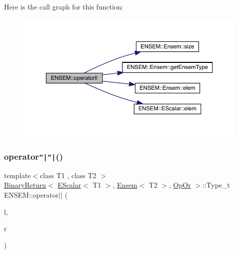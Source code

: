 Here is the call graph for this function\+:\nopagebreak
\begin{figure}[H]
\begin{center}
\leavevmode
\includegraphics[width=350pt]{d1/d9e/group__eensem_ga575e86e9777d7a353311ab43c237a84b_cgraph}
\end{center}
\end{figure}
\mbox{\label{group__eensem_ga433f0b529c387d8299dd5c8eb5a9b3b0}} 
\subsubsection{\texorpdfstring{operator\texttt{"|}\texttt{"|}()}{operator||()}\hspace{0.1cm}{\footnotesize\ttfamily [3/3]}}
{\footnotesize\ttfamily template$<$class T1 , class T2 $>$ \\
\mbox{\hyperlink{structENSEM_1_1BinaryReturn}{Binary\+Return}}$<$ \mbox{\hyperlink{classENSEM_1_1EScalar}{E\+Scalar}}$<$ T1 $>$, \mbox{\hyperlink{classENSEM_1_1Ensem}{Ensem}}$<$ T2 $>$, \mbox{\hyperlink{structENSEM_1_1OpOr}{Op\+Or}} $>$\+::Type\+\_\+t E\+N\+S\+E\+M\+::operator$\vert$$\vert$ (\begin{DoxyParamCaption}\item[{const \mbox{\hyperlink{classENSEM_1_1EScalar}{E\+Scalar}}$<$ T1 $>$ \&}]{l,  }\item[{const \mbox{\hyperlink{classENSEM_1_1Ensem}{Ensem}}$<$ T2 $>$ \&}]{r }\end{DoxyParamCaption})\hspace{0.3cm}{\ttfamily [inline]}}

